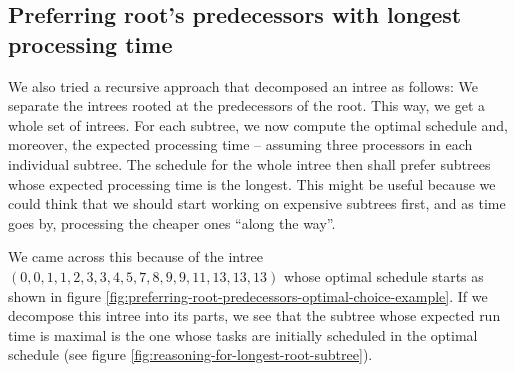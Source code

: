 \subsection{Preferring root's predecessors with longest processing time}
\label{sec:suboptimal-hlf-can-roots-longest-predecessors}

We also tried a recursive approach that decomposed an intree as follows: We separate the intrees rooted at the predecessors of the root. This way, we get a whole set of intrees. For each subtree, we now compute the optimal schedule and, moreover, the expected processing time -- assuming three processors in each individual subtree. The schedule for the whole intree then shall prefer subtrees whose expected processing time is the longest. This might be useful because we could think that we should start working on expensive subtrees first, and as time goes by, processing the cheaper ones ``along the way''.

We came across this because of the intree $(0,0,1,1,2,3,3,4,5,7,8,9,9,11,13,13,13)$ whose optimal schedule starts as shown in figure \ref{fig:preferring-root-predecessors-optimal-choice-example}. If we decompose this intree into its parts, we see that the subtree whose expected run time is maximal is the one whose tasks are initially scheduled in the optimal schedule (see figure \ref{fig:reasoning-for-longest-root-subtree}).

